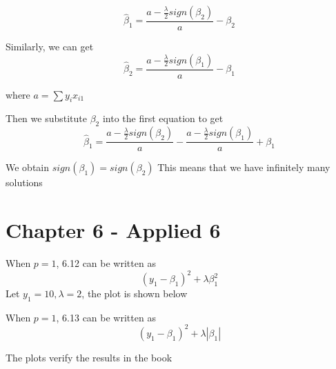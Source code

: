 \documentclass{article}
\begin{document}
\begin{enumerate}[label=(\alph*)]
\[
\hat \beta_1 = \frac{a - \frac{\lambda}{2} sign(\beta_2)}{a} - \beta_2
\]

Similarly, we can get
\[
    \hat \beta_2 = \frac{a - \frac{\lambda}{2} sign(\beta_1)}{a} - \beta_1
\]

where \(a = \sum y_i x_{i1}\)

Then we substitute \(\beta_2\) into the first equation to get
\[
    \hat \beta_1 = \frac{a - \frac{\lambda}{2} sign(\beta_2)}{a} - \frac{a - \frac{\lambda}{2} sign(\beta_1)}{a} + \beta_1
\]

We obtain \(sign(\beta_1) = sign(\beta_2 )\)
This means that we have infinitely many solutions
\end{enumerate}

\newpage
\section{Chapter 6 - Applied 6}
When \(p=1\), 6.12 can be written as 
\[(y_1 - \beta_1)^2 + \lambda \beta_1^2\]
Let \(y_1 = 10, \lambda = 2\), the plot is shown below

When \(p=1\), 6.13 can be written as 
\[(y_1 - \beta_1)^2 + \lambda |\beta_1|\]

The plots verify the results in the book
\end{document}

